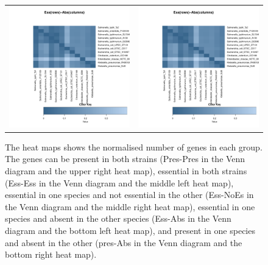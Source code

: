 \documentclass[a4paper,10pt, twocolumn]{article}
\begin{document}
\begin{figure}
\begin{tabular}{c c}
\includegraphics[page=1, scale=0.34]{essentiality-heatmap.pdf} &
\includegraphics[page=4, scale=0.34]{essentiality-heatmap.pdf}
\end{tabular}
\caption{The heat maps shows the normalised number of genes in each group. The genes can be present in both strains (Pres-Pres in the Venn diagram and the upper right heat map), essential in both strains (Ess-Ess in the Venn diagram and the middle left heat map), essential in one species and not essential in the other (Ess-NoEs in the Venn diagram and the middle right heat map), essential in one species and absent in the other species (Ess-Abs in the Venn diagram and the bottom left heat map), and present in one species and absent in the other (pres-Abs in the Venn diagram and the bottom right heat map).}
\label{fig:pairwise-venn}
\end{figure}
\end{document}
